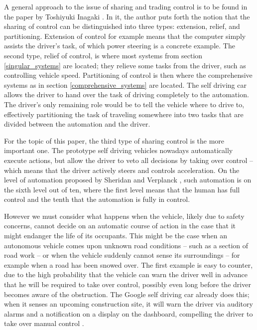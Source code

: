 \documentclass{acm_proc_article-sp}
\begin{document}
A general approach to the issue of sharing and trading control is to be found in the paper by Toshiyuki Inagaki \cite{inagaki:adaptive}.
In it, the author puts forth the notion that the sharing of control can be distinguished into three types: extension, relief, and partitioning.
Extension of control for example means that the computer simply assists the driver's task, of which power steering is a concrete example.
The second type, relief of control, is where most systems from section \ref{singular_systems} are located; they relieve some tasks from the driver, such as controlling vehicle speed.
Partitioning of control is then where the comprehensive systems as in section \ref{comprehensive_systems} are located.
The self driving car allows the driver to hand over the task of driving completely to the automation.
The driver's only remaining role would be to tell the vehicle where to drive to, effectively partitioning the task of traveling somewhere into two tasks that are divided between the automation and the driver.

For the topic of this paper, the third type of sharing control is the more important one.
The prototype self driving vehicles nowadays automatically execute actions, but allow the driver to veto all decisions by taking over control – which means that the driver actively steers and controls acceleration.
On the level of automation proposed by Sheridan and Verplanck \cite{sheridan:human}, such automation is on the sixth level out of ten, where the first level means that the human has full control and the tenth that the automation is fully in control.

However we must consider what happens when the vehicle, likely due to safety concerns, cannot decide on an automatic course of action in the case that it might endanger the life of its occupants.
This might be the case when an autonomous vehicle comes upon unknown road conditions – such as a section of road work – or when the vehicle suddenly cannot sense its surroundings – for example when a road has been snowed over.
The first example is easy to counter, due to the high probability that the vehicle can warn the driver well in advance that he will be required to take over control, possibly even long before the driver becomes aware of the obstruction.
The Google self driving car already does this; when it senses an upcoming construction site, it will warn the driver via auditory alarms and a notification on a display on the dashboard, compelling the driver to take over manual control \cite{www:newyorker_google_car}.
\end{document}
